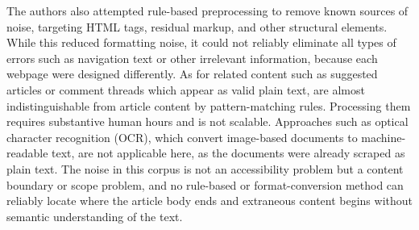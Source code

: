\documentclass{article}
\begin{document}
The authors also attempted rule-based preprocessing to remove known sources of noise, targeting HTML tags, residual markup, and other structural elements. While this reduced formatting noise, it could not reliably eliminate all types of errors such as navigation text or other irrelevant information, because each webpage were designed differently. As for related content such as suggested articles or comment threads which appear as valid plain text, are almost indistinguishable from article content by pattern-matching rules. Processing them requires substantive human hours and is not scalable. Approaches such as optical character recognition (OCR), which convert image-based documents to machine-readable text, are not applicable here, as the documents were already scraped as plain text. The noise in this corpus is not an accessibility problem but a content boundary or scope problem, and no rule-based or format-conversion method can reliably locate where the article body ends and extraneous content begins without semantic understanding of the text.

\clearpage

\newpage
\printbibliography
\end{document}
